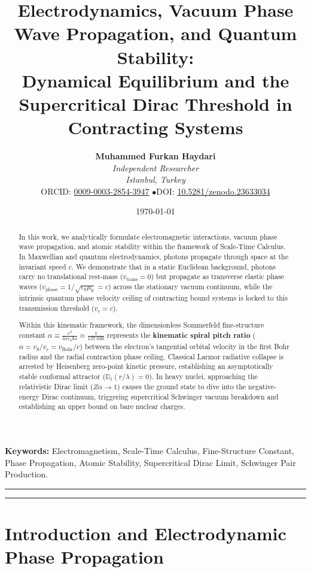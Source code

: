 \documentclass[11pt,a4paper]{article}
\title{\textbf{Electrodynamics, Vacuum Phase Wave Propagation, and Quantum Stability: \\ Dynamical Equilibrium and the Supercritical Dirac Threshold in Contracting Systems}}
\author{
    \textbf{Muhammed Furkan Haydari} \\
    \textit{Independent Researcher} \\
    \textit{Istanbul, Turkey} \\
    \small ORCID: \href{https://orcid.org/0009-0003-2854-3947}{0009-0003-2854-3947} \quad$\bullet$\quad \small DOI: \href{https://doi.org/10.5281/zenodo.23633034}{10.5281/zenodo.23633034}
}
\date{\today}
\begin{document}
\maketitle

\begin{abstract}
    In this work, we analytically formulate electromagnetic interactions, vacuum phase wave propagation, and atomic stability within the framework of Scale-Time Calculus. In Maxwellian and quantum electrodynamics, photons propagate through space at the invariant speed $c$. We demonstrate that in a static Euclidean background, photons carry no translational rest-mass ($v_{\mathrm{trans}} = 0$) but propagate as transverse elastic phase waves ($v_{\mathrm{phase}} = 1/\sqrt{\varepsilon_0\mu_0} = c$) across the stationary vacuum continuum, while the intrinsic quantum phase velocity ceiling of contracting bound systems is locked to this transmission threshold ($v_c = c$).

    Within this kinematic framework, the dimensionless Sommerfeld fine-structure constant $\alpha \equiv \frac{e^2}{4\pi\varepsilon_0\hbar c} \approx \frac{1}{137.036}$ represents the \textbf{kinematic spiral pitch ratio} ($\alpha = v_\theta / v_r = v_{\mathrm{Bohr}}/c$) between the electron's tangential orbital velocity in the first Bohr radius and the radial contraction phase ceiling. Classical Larmor radiative collapse is arrested by Heisenberg zero-point kinetic pressure, establishing an asymptotically stable conformal attractor ($\mathbb{D}_t(r/\lambda) = 0$). In heavy nuclei, approaching the relativistic Dirac limit ($Z\alpha \to 1$) causes the ground state to dive into the negative-energy Dirac continuum, triggering supercritical Schwinger vacuum breakdown and establishing an upper bound on bare nuclear charges.
\end{abstract}

\vspace{1em}
\noindent\textbf{Keywords:} Electromagnetism, Scale-Time Calculus, Fine-Structure Constant, Phase Propagation, Atomic Stability, Supercritical Dirac Limit, Schwinger Pair Production.

\vspace{1em}
\hrule
\vspace{0.8em}
\tableofcontents
\vspace{0.8em}
\hrule
\vspace{1.5em}

\section{Introduction and Electrodynamic Phase Propagation}
\label{sec:giris}
\end{document}
